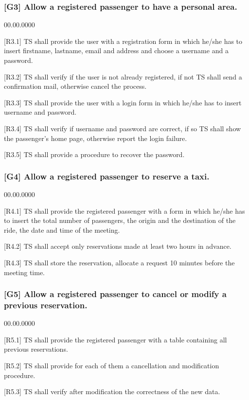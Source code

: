 \subsubsection{{[}G3{]} Allow a registered passenger to have a personal area.}
\begin{lyxlist}{00.00.0000}
\item [{{[}R3.1{]}}] TS shall provide the user with a registration form
in which he/she has to insert firstname, lastname, email and address
and choose a username and a password.
\item [{{[}R3.2{]}}] TS shall verify if the user is not already registered,
if not TS shall send a confirmation mail, otherwise cancel the process.
\item [{{[}R3.3{]}}] TS shall provide the user with a login form in which
he/she has to insert username and password.
\item [{{[}R3.4{]}}] TS shall verify if username and password are correct,
if so TS shall show the passenger's home page, otherwise report the
login failure.
\item [{{[}R3.5{]}}] TS shall provide a procedure to recover the password.
\end{lyxlist}

\subsubsection{{[}G4{]} Allow a registered passenger to reserve a taxi.}
\begin{lyxlist}{00.00.0000}
\item [{{[}R4.1{]}}] TS shall provide the registered passenger with a form
in which he/she has to insert the total number of passengers, the
origin and the destination of the ride, the date and time of the meeting.
\item [{{[}R4.2{]}}] TS shall accept only reservations made at least two
hours in advance.
\item [{{[}R4.3{]}}] TS shall store the reservation, allocate a request
10 minutes before the meeting time.
\end{lyxlist}

\subsubsection{{[}G5{]} Allow a registered passenger to cancel or modify a previous
reservation. }
\begin{lyxlist}{00.00.0000}
\item [{{[}R5.1{]}}] TS shall provide the registered passenger with a table
containing all previous reservations.
\item [{{[}R5.2{]}}] TS shall provide for each of them a cancellation and
modification procedure.
\item [{{[}R5.3{]}}] TS shall verify after modification the correctness
of the new data.
\end{lyxlist}

